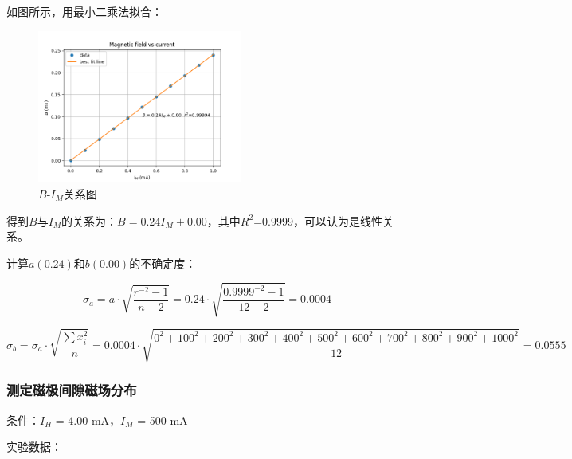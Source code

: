 \documentclass[UTF8]{ctexart}
\begin{document}
如图所示，用最小二乘法拟合：

\begin{center}
    \begin{figure}[H]
        \centering
        \includegraphics[width=0.6\textwidth]{img/Magnetic_field_vs_current.png}
        \caption{$B$-$I_M$关系图}
        \label{B-I_M}
    \end{figure}
\end{center}

得到$B$与$I_M$的关系为：$B = 0.24I_M + 0.00$，其中$R^2$=0.9999，可以认为是线性关系。

计算$a(0.24)$和$b(0.00)$的不确定度：

$$\sigma_a=a\cdot\sqrt{\frac{r^{-2}-1}{n-2}}=0.24\cdot\sqrt{\frac{0.9999^{-2}-1}{12-2}}=0.0004$$

$$\sigma_b=\sigma_a\cdot\sqrt{\frac{\sum x_i^2}{n}}=0.0004\cdot\sqrt{\frac{0^2+100^2+200^2+300^2+400^2+500^2+600^2+700^2+800^2+900^2+1000^2}{12}}=0.0555$$

\subsubsection{测定磁极间隙磁场分布}

条件：$I_H$ = 4.00 mA，$I_M$ = 500 mA

实验数据：
\end{document}
